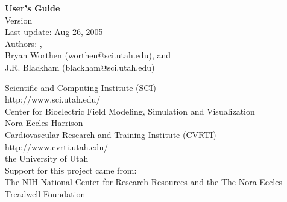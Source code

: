   \mbox{}
  \vspace{2in}
\begin{center}
   {\huge\bf \map{} User's Guide}\\
   \vspace{.5in}
   {\Large Version \version{}\\
   \medskip
   Last update: Aug 26, 2005 \\}
   \bigskip
   {\Large Authors: \rob{}, \\
   Bryan Worthen (worthen@sci.utah.edu), and \\
   J.R. Blackham (blackham@sci.utah.edu)}
   \bigskip

   {\Large 
   \medskip
   Scientific and Computing Institute (SCI)\\
   {http://www.sci.utah.edu/}\\
   \medskip
   Center for Bioelectric Field Modeling, Simulation and Visualization
   \\
   \medskip
   Nora Eccles Harrison \\
   Cardiovascular Research and Training Institute (CVRTI)\\
   {http://www.cvrti.utah.edu/}\\
   \medskip
   the University of Utah}\\

   \bigskip
   Support for this project came from:\\
   \medskip
   {\Large The NIH National Center for Research Resources  
    and the The Nora
   Eccles Treadwell Foundation\\ 
   \smallskip
   }

\end{center}

